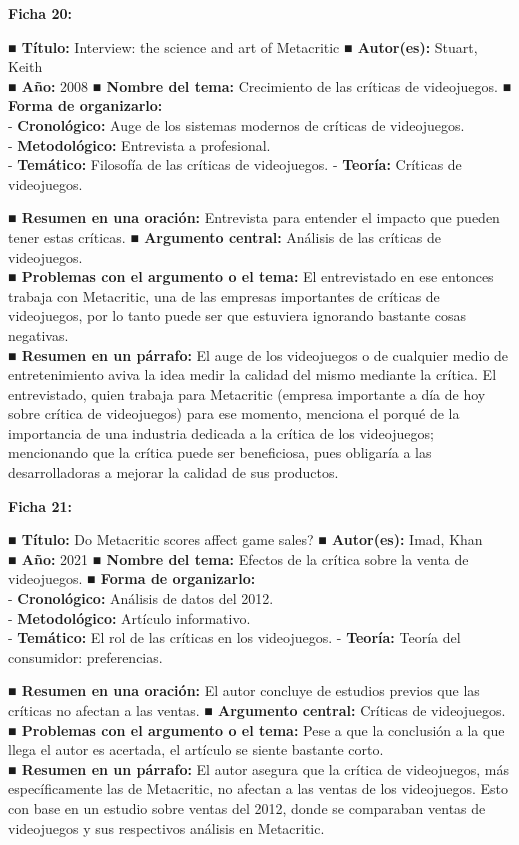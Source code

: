 \documentclass[
  letterpaper,
  DIV=11,
  numbers=noendperiod]{scrreprt}
\begin{document}
\textbf{Ficha 20:}

\textbf{■ Título:} Interview: the science and art of Metacritic
\textbf{■ Autor(es):} Stuart, Keith\\
\textbf{■ Año:} 2008 \textbf{■ Nombre del tema:} Crecimiento de las
críticas de videojuegos. \textbf{■ Forma de organizarlo:}\\
- \textbf{Cronológico:} Auge de los sistemas modernos de críticas de
videojuegos.\\
- \textbf{Metodológico:} Entrevista a profesional.\\
- \textbf{Temático:} Filosofía de las críticas de videojuegos. -
\textbf{Teoría:} Críticas de videojuegos.

\textbf{■ Resumen en una oración:} Entrevista para entender el impacto
que pueden tener estas críticas. \textbf{■ Argumento central:} Análisis
de las críticas de videojuegos.\\
\textbf{■ Problemas con el argumento o el tema:} El entrevistado en ese
entonces trabaja con Metacritic, una de las empresas importantes de
críticas de videojuegos, por lo tanto puede ser que estuviera ignorando
bastante cosas negativas.\\
\textbf{■ Resumen en un párrafo:} El auge de los videojuegos o de
cualquier medio de entretenimiento aviva la idea medir la calidad del
mismo mediante la crítica. El entrevistado, quien trabaja para
Metacritic (empresa importante a día de hoy sobre crítica de
videojuegos) para ese momento, menciona el porqué de la importancia de
una industria dedicada a la crítica de los videojuegos; mencionando que
la crítica puede ser beneficiosa, pues obligaría a las desarrolladoras a
mejorar la calidad de sus productos.

\textbf{Ficha 21:}

\textbf{■ Título:} Do Metacritic scores affect game sales? \textbf{■
Autor(es):} Imad, Khan\\
\textbf{■ Año:} 2021 \textbf{■ Nombre del tema:} Efectos de la crítica
sobre la venta de videojuegos. \textbf{■ Forma de organizarlo:}\\
- \textbf{Cronológico:} Análisis de datos del 2012.\\
- \textbf{Metodológico:} Artículo informativo.\\
- \textbf{Temático:} El rol de las críticas en los videojuegos. -
\textbf{Teoría:} Teoría del consumidor: preferencias.

\textbf{■ Resumen en una oración:} El autor concluye de estudios previos
que las críticas no afectan a las ventas. \textbf{■ Argumento central:}
Críticas de videojuegos.\\
\textbf{■ Problemas con el argumento o el tema:} Pese a que la
conclusión a la que llega el autor es acertada, el artículo se siente
bastante corto.\\
\textbf{■ Resumen en un párrafo:} El autor asegura que la crítica de
videojuegos, más específicamente las de Metacritic, no afectan a las
ventas de los videojuegos. Esto con base en un estudio sobre ventas del
2012, donde se comparaban ventas de videojuegos y sus respectivos
análisis en Metacritic.
\end{document}
